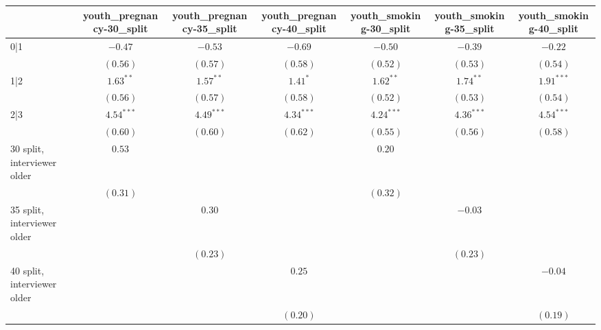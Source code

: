 
\usepackage{booktabs}
\usepackage{threeparttable}

\begin{table}
\begin{center}
\begin{threeparttable}
\begin{tabular}{l c c c c c c}
\toprule
 & youth_pregnancy-30_split & youth_pregnancy-35_split & youth_pregnancy-40_split & youth_smoking-30_split & youth_smoking-35_split & youth_smoking-40_split \\
\midrule
0|1                             & $-0.47$       & $-0.53$       & $-0.69$       & $-0.50$       & $-0.39$       & $-0.22$       \\
                                & $(0.56)$      & $(0.57)$      & $(0.58)$      & $(0.52)$      & $(0.53)$      & $(0.54)$      \\
1|2                             & $1.63^{**}$   & $1.57^{**}$   & $1.41^{*}$    & $1.62^{**}$   & $1.74^{**}$   & $1.91^{***}$  \\
                                & $(0.56)$      & $(0.57)$      & $(0.58)$      & $(0.52)$      & $(0.53)$      & $(0.54)$      \\
2|3                             & $4.54^{***}$  & $4.49^{***}$  & $4.34^{***}$  & $4.24^{***}$  & $4.36^{***}$  & $4.54^{***}$  \\
                                & $(0.60)$      & $(0.60)$      & $(0.62)$      & $(0.55)$      & $(0.56)$      & $(0.58)$      \\
30 split, interviewer older     & $0.53$        &               &               & $0.20$        &               &               \\
                                & $(0.31)$      &               &               & $(0.32)$      &               &               \\
35 split, interviewer older     &               & $0.30$        &               &               & $-0.03$       &               \\
                                &               & $(0.23)$      &               &               & $(0.23)$      &               \\
40 split, interviewer older     &               &               & $0.25$        &               &               & $-0.04$       \\
                                &               &               & $(0.20)$      &               &               & $(0.19)$      \\

\end{tabular}
\end{threeparttable}
\end{center}
\end{table}

